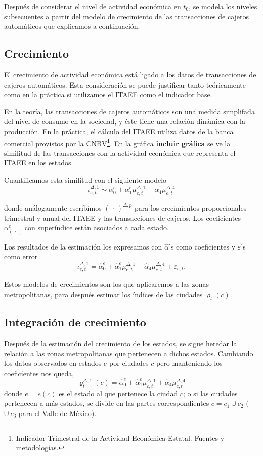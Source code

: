\documentclass[]{article}
\let\rmarkdownfootnote\footnote%
\def\footnote{\protect\rmarkdownfootnote}
\begin{document}
Después de considerar el nivel de actividad económica en \(t_0\), se
modela los niveles subsecuentes a partir del modelo de crecimiento de
las transacciones de cajeros automáticos que explicamos a continuación.

\subsection{Crecimiento}\label{crecimiento}

El crecimiento de actividad económica está ligado a los datos de
transacciones de cajeros automáticos. Esta consideración se puede
justificar tanto teóricamente como en la práctica si utilizamos el ITAEE
como el indicador base.

En la teoría, las transacciones de cajeros automáticos son una medida
simplifada del nivel de consumo en la sociedad, y éste tiene una
relación dinámica con la producción. En la práctica, el cálculo del
ITAEE utiliza datos de la banca comercial provistos por la
CNBV\footnote{Indicador Trimestral de la Actividad Económica Estatal.
  Fuentes y metodologías.}. En la gráfica \textbf{incluir gráfica} se ve
la similitud de las transacciones con la actividad económica que
representa el ITAEE en los estados.

Cuantificamos esta similitud con el siguiente modelo
\[ \iota_{e,t}^{\Delta,1} \sim \alpha_0^e + 
\alpha_1^e\mu_{e,t}^{\Delta,1} + \alpha_4\mu_{e,t}^{\Delta,4}\]

donde análogamente escribimos \((\,\cdot\,)^{\Delta,p}\) para los
crecimientos proporcionales trimestral y anual del ITAEE y las
transacciones de cajeros. Los coeficientes \(\alpha_{(\,\cdot\,)}^e\)
con superíndice están asociados a cada estado.

Los resultados de la estimación los expresamos con \(\hat \alpha\)'s
como coeficientes y \(\varepsilon\)'s como error
\[ \iota_{e,t}^{\Delta,1} = \hat\alpha_0^e + 
\hat\alpha_1^e\mu_{e,t}^{\Delta,1} + \hat\alpha_4\mu_{e,t}^{\Delta,4} + \varepsilon_{e,t}. \]

Estos modelos de crecimientos son los que aplicaremos a las zonas
metropolitanas, para después estimar los índices de las ciudades
\(\varrho_t(c)\).

\subsection{Integración de
crecimiento}\label{integracion-de-crecimiento}

Después de la estimación del crecimiento de los estados, se sigue
heredar la relación a las zonas metropolitanas que pertenecen a dichos
estados. Cambiando los datos observados en estados \(e\) por ciudades
\(c\) pero manteniendo los coeficientes nos queda,
\[ \varrho_{t}^{\Delta,1}(c) = \hat\alpha_0^e + 
\hat\alpha_1^e\mu_{c,t}^{\Delta,1} + \hat\alpha_4\mu_{c,t}^{\Delta,4} \]
donde \(e = e(c)\) es el estado al que pertenece la ciudad \(c\); o si
las ciudades pertenecen a más estados, se divide en las partes
correspondientes \(c=c_1\cup c_2\) (\(\cup\ c_3\) para el Valle de
México).
\end{document}
